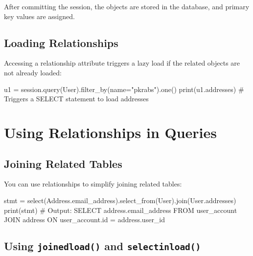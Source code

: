 \documentclass[
  letterpaper,
  DIV=11,
  numbers=noendperiod]{scrreprt}
\newenvironment{Shaded}{\begin{snugshade}}{\end{snugshade}}
\newcommand{\BuiltInTok}[1]{\textcolor[rgb]{0.00,0.23,0.31}{#1}}
\newcommand{\CommentTok}[1]{\textcolor[rgb]{0.37,0.37,0.37}{#1}}
\newcommand{\NormalTok}[1]{\textcolor[rgb]{0.00,0.23,0.31}{#1}}
\newcommand{\OperatorTok}[1]{\textcolor[rgb]{0.37,0.37,0.37}{#1}}
\newcommand{\StringTok}[1]{\textcolor[rgb]{0.13,0.47,0.30}{#1}}
\begin{document}
After committing the session, the objects are stored in the database,
and primary key values are assigned.

\subsection{Loading Relationships}\label{loading-relationships}

Accessing a relationship attribute triggers a lazy load if the related
objects are not already loaded:

\begin{Shaded}
\begin{Highlighting}[]
\NormalTok{u1 }\OperatorTok{=}\NormalTok{ session.query(User).filter\_by(name}\OperatorTok{=}\StringTok{"pkrabs"}\NormalTok{).one()}
\BuiltInTok{print}\NormalTok{(u1.addresses)  }\CommentTok{\# Triggers a SELECT statement to load addresses}
\end{Highlighting}
\end{Shaded}

\section{Using Relationships in
Queries}\label{using-relationships-in-queries}

\subsection{Joining Related Tables}\label{joining-related-tables}

You can use relationships to simplify joining related tables:

\begin{Shaded}
\begin{Highlighting}[]
\NormalTok{stmt }\OperatorTok{=}\NormalTok{ select(Address.email\_address).select\_from(User).join(User.addresses)}
\BuiltInTok{print}\NormalTok{(stmt)}
\CommentTok{\# Output: SELECT address.email\_address FROM user\_account JOIN address ON user\_account.id = address.user\_id}
\end{Highlighting}
\end{Shaded}

\subsection{\texorpdfstring{Using \texttt{joinedload()} and
\texttt{selectinload()}}{Using joinedload() and selectinload()}}\label{using-joinedload-and-selectinload}
\end{document}
